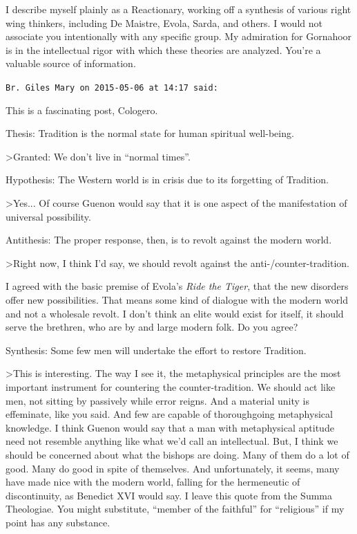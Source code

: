 \begin{footnotesize}
\begin{sffamily}
I describe myself plainly as a Reactionary, working off a synthesis of various right wing thinkers, including De Maistre, Evola, Sarda, and others. I would not associate you intentionally with any specific group. My admiration for Gornahoor is in the intellectual rigor with which these theories are analyzed. You're a valuable source of information.

\hfill

\texttt{Br. Giles Mary on 2015-05-06 at 14:17 said:}

This is a fascinating post, Cologero.

Thesis: Tradition is the normal state for human spiritual well-being.

\textgreater Granted: We don't live in ``normal times''.


Hypothesis: The Western world is in crisis due to its forgetting of Tradition.

\textgreater Yes... Of course Guenon would say that it is one aspect of the manifestation of universal possibility.

Antithesis: The proper response, then, is to revolt against the modern world.

\textgreater Right now, I think I'd say, we should revolt against the anti-/counter-tradition.

I agreed with the basic premise of Evola's \textit{Ride the Tiger}, that the new disorders offer new possibilities. That means some kind of dialogue with the modern world and not a wholesale revolt. I don't think an elite would exist for itself, it should serve the brethren, who are by and large modern folk. Do you agree?

Synthesis: Some few men will undertake the effort to restore Tradition.

\textgreater This is interesting. The way I see it, the metaphysical principles are the most important instrument for countering the counter-tradition. We should act like men, not sitting by passively while error reigns. And a material unity is effeminate, like you said. And few are capable of thoroughgoing metaphysical knowledge. I think Guenon would say that a man with metaphysical aptitude need not resemble anything like what we'd call an intellectual. But, I think we should be concerned about what the bishops are doing. Many of them do a lot of good. Many do good in spite of themselves. And unfortunately, it seems, many have made nice with the modern world, falling for the hermeneutic of discontinuity, as Benedict XVI would say. I leave this quote from the Summa Theologiae. You might substitute, ``member of the faithful'' for ``religious'' if my point has any substance.


\end{sffamily}
\end{footnotesize}
